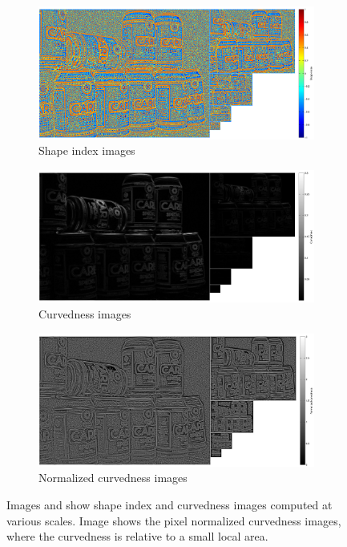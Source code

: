 \documentclass[thesis.tex]{subfiles}
\begin{document}
\begin{figure}[p]
    \centering
    \begin{subfigure}[t]{0.97\textwidth}
		\includegraphics[width=\textwidth]{img/cellHistScaleSpacesS.pdf}
    	\caption{Shape index images}
    	\label{fig:cellHistScaleSpacesS}
	\end{subfigure}
    \begin{subfigure}[t]{0.97\textwidth}
		\includegraphics[width=\textwidth]{img/cellHistScaleSpacesC.pdf}
    	\caption{Curvedness images}
    	\label{fig:cellHistScaleSpacesC}
	\end{subfigure}
	\begin{subfigure}[t]{0.97\textwidth}
		\includegraphics[width=\textwidth]{img/cellHistScaleSpacesCnorm.pdf}
    	\caption{Normalized curvedness images}
    	\label{fig:cellHistScaleSpacesCnorm}
	\end{subfigure}
	\caption{Images  and  show shape index and curvedness images computed at various scales. Image  shows the pixel normalized curvedness images, where the curvedness is relative to a small local area.}
	\label{fig:cellHistScaleSpacesSC}
\end{figure}
\end{document}
